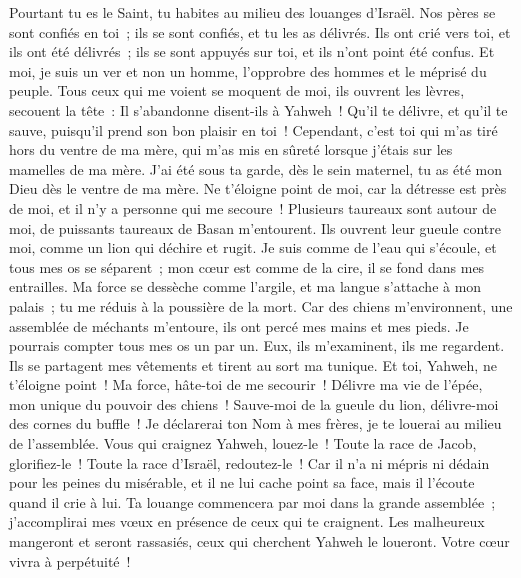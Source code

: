 \begin{multicols}{2}
Pourtant tu es le Saint, tu habites au milieu des louanges d'Israël.
Nos pères se sont confiés en toi~; ils se sont confiés, et tu les as délivrés.
Ils ont crié vers toi, et ils ont été délivrés~; ils se sont appuyés sur toi, et ils n'ont point été confus.
Et moi, je suis un ver et non un homme, l'opprobre des hommes et le méprisé du peuple.
Tous ceux qui me voient se moquent de moi, ils ouvrent les lèvres, secouent la tête~:
Il s'abandonne disent-ils à Yahweh~! Qu'il te délivre, et qu'il te sauve, puisqu'il prend son bon plaisir en toi~!
Cependant, c'est toi qui m'as tiré hors du ventre de ma mère, qui m'as mis en sûreté lorsque j'étais sur les mamelles de ma mère.
J'ai été sous ta garde, dès le sein maternel, tu as été mon Dieu dès le ventre de ma mère.
Ne t'éloigne point de moi, car la détresse est près de moi, et il n'y a personne qui me secoure~!
Plusieurs taureaux sont autour de moi, de puissants taureaux de Basan m'entourent.
Ils ouvrent leur gueule contre moi, comme un lion qui déchire et rugit.
Je suis comme de l'eau qui s'écoule, et tous mes os se séparent~; mon cœur est comme de la cire, il se fond dans mes entrailles.
Ma force se dessèche comme l'argile, et ma langue s'attache à mon palais~; tu me réduis à la poussière de la mort.
Car des chiens m'environnent, une assemblée de méchants m'entoure, ils ont percé mes mains et mes pieds.
Je pourrais compter tous mes os un par un. Eux, ils m'examinent, ils me regardent.
Ils se partagent mes vêtements et tirent au sort ma tunique.
Et toi, Yahweh, ne t'éloigne point~! Ma force, hâte-toi de me secourir~!
Délivre ma vie de l'épée, mon unique du pouvoir des chiens~!
Sauve-moi de la gueule du lion, délivre-moi des cornes du buffle~!
Je déclarerai ton Nom à mes frères, je te louerai au milieu de l'assemblée.
Vous qui craignez Yahweh, louez-le~! Toute la race de Jacob, glorifiez-le~! Toute la race d'Israël, redoutez-le~!
Car il n'a ni mépris ni dédain pour les peines du misérable, et il ne lui cache point sa face, mais il l'écoute quand il crie à lui.
Ta louange commencera par moi dans la grande assemblée~; j'accomplirai mes vœux en présence de ceux qui te craignent.
Les malheureux mangeront et seront rassasiés, ceux qui cherchent Yahweh le loueront. Votre cœur vivra à perpétuité~!

\end{multicols}
